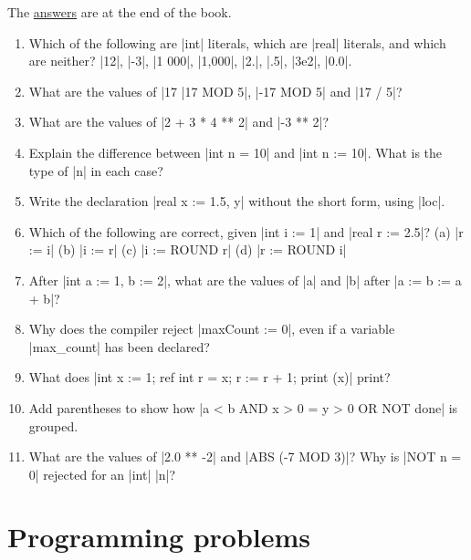 The \hyperref[ans-ch2]{answers} are at the end of the book.

\begin{enumerate}
\item Which of the following are \code|int| literals, which are
  \code|real| literals, and which are neither?
  \code|12|, \code|-3|, \code|1 000|, \code|1,000|, \code|2.|, \code|.5|,
  \code|3e2|, \code|0.0|.
\item What are the values of \code|17 %
  \code|17 MOD 5|, \code|-17 MOD 5| and \code|17 / 5|?
\item What are the values of \code|2 + 3 * 4 ** 2| and
  \code|-3 ** 2|?
\item Explain the difference between \code|int n = 10| and
  \code|int n := 10|. What is the type of \code|n| in each case?
\item Write the declaration \code|real x := 1.5, y| without the short
  form, using \code|loc|.
\item Which of the following are correct, given \code|int i := 1| and
  \code|real r := 2.5|? \quad (a) \code|r := i| \quad (b) \code|i := r|
  \quad (c) \code|i := ROUND r| \quad (d) \code|r := ROUND i|
\item After \code|int a := 1, b := 2|, what are the values of \code|a|
  and \code|b| after \code|a := b := a + b|?
\item Why does the compiler reject \code|maxCount := 0|, even if a
  variable \code|max_count| has been declared?
\item What does \code|int x := 1; ref int r = x; r := r + 1; print (x)|
  print?
\item Add parentheses to show how
  \code|a < b AND x > 0 = y > 0 OR NOT done| is grouped.
\item What are the values of \code|2.0 ** -2| and \code|ABS (-7 MOD 3)|?
  Why is \code|NOT n = 0| rejected for an \code|int| \code|n|?
\end{enumerate}

\section*{Programming problems}

